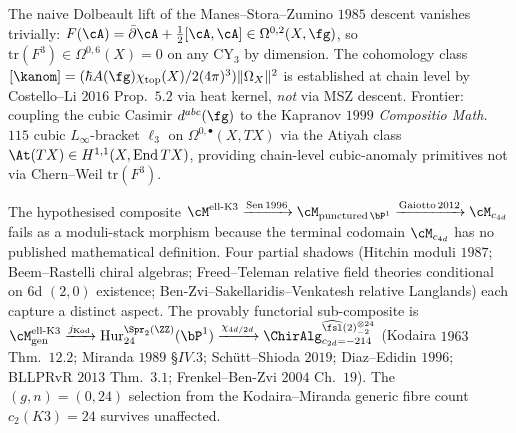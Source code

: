 \begin{remark}
\label{wn:frontier:wave3-BZ-Kapranov}\ClaimStatusOpen
The naive Dolbeault lift of the Manes--Stora--Zumino $1985$ descent
vanishes trivially: $F(\cA) = \bar\partial\cA + \tfrac{1}{2}[\cA, \cA]
\in \Omega^{0, 2}(X, \fg)$, so $\mathrm{tr}(F^3) \in \Omega^{0, 6}(X) = 0$
on any CY$_3$ by dimension. The cohomology class
$[\kanom] = (\hbar A(\fg)\chi_{\mathrm{top}}(X)/2(4\pi)^3)
\|\Omega_X\|^2$ is established at chain level by Costello--Li $2016$
Prop.~$5.2$ via heat kernel, \emph{not} via MSZ descent. Frontier:
coupling the cubic Casimir $d^{abc}(\fg)$ to the Kapranov $1999$
\emph{Compositio Math.} $115$ cubic $L_\infty$-bracket
$\ell_3$ on $\Omega^{0,\bullet}(X, TX)$ via the Atiyah class
$\At(TX) \in H^{1,1}(X, \mathrm{End}\,TX)$, providing chain-level
cubic-anomaly primitives not via Chern--Weil $\mathrm{tr}(F^3)$.
\end{remark}

\begin{remark}
\label{wn:frontier:wave3-KM-classS}\ClaimStatusOpen
The hypothesised composite
$\cM^{\mathrm{ell\text{-}K3}}\xrightarrow{\mathrm{Sen}\,1996}
\cM_{\mathrm{punctured}\,\bP^1}\xrightarrow{\mathrm{Gaiotto}\,2012}
\cM_{c_{4d}}$ fails as a moduli-stack morphism because the terminal
codomain $\cM_{c_{4d}}$ has no published mathematical definition.
Four partial shadows (Hitchin moduli $1987$;
Beem--Rastelli chiral algebras;
Freed--Teleman relative field theories conditional on $6$d $(2,0)$
existence; Ben-Zvi--Sakellaridis--Venkatesh relative Langlands) each
capture a distinct aspect. The provably functorial sub-composite is
$\cM^{\mathrm{ell\text{-}K3}}_{\mathrm{gen}}
\xrightarrow{j_{\mathrm{Kod}}} \mathrm{Hur}_{24}^{\Spr_2(\ZZ)}(\bP^1)
\xrightarrow{\chi_{4d/2d}}
\ChirAlg^{\widehat{\fsl}(2)_{-2}^{\otimes 24}}_{c_{2d} = -214}$
(Kodaira $1963$ Thm.~$12.2$; Miranda $1989$ \S$IV.3$;
Sch\"utt--Shioda $2019$; Diaz--Edidin $1996$; BLLPRvR $2013$
Thm.~$3.1$; Frenkel--Ben-Zvi $2004$ Ch.~$19$). The $(g, n) = (0, 24)$
selection from the Kodaira--Miranda generic fibre count
$c_2(K3) = 24$ survives unaffected.
\end{remark}

